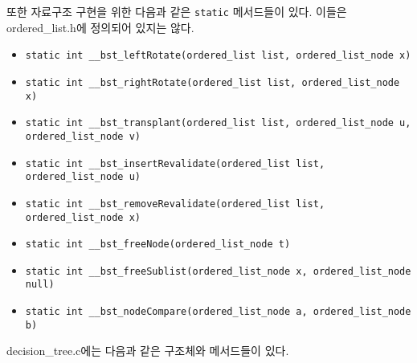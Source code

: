 또한 자료구조 구현을 위한 다음과 같은 \texttt{static} 메서드들이 있다. 이들은 ordered_list.h에 정의되어 있지는 않다.

\begin{itemize}
    \item \texttt{static int __bst_leftRotate(ordered_list list, ordered_list_node x)}
    \item \texttt{static int __bst_rightRotate(ordered_list list, ordered_list_node x)}
    \item \texttt{static int __bst_transplant(ordered_list list, ordered_list_node u, ordered_list_node v)}
    \item \texttt{static int __bst_insertRevalidate(ordered_list list, ordered_list_node u)}
    \item \texttt{static int __bst_removeRevalidate(ordered_list list, ordered_list_node x)}
    \item \texttt{static int __bst_freeNode(ordered_list_node t)}
    \item \texttt{static int __bst_freeSublist(ordered_list_node x, ordered_list_node null)}
    \item \texttt{static int __bst_nodeCompare(ordered_list_node a, ordered_list_node b)}
\end{itemize}

decision_tree.c에는 다음과 같은 구조체와 메서드들이 있다.

